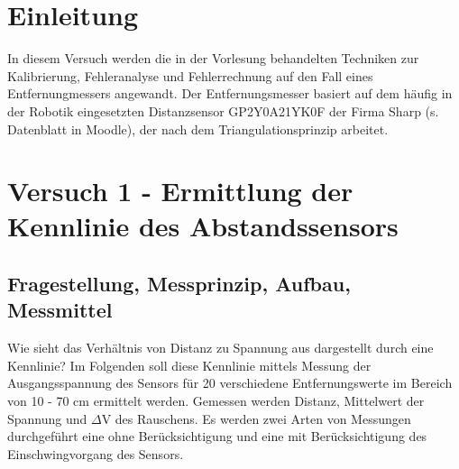 \documentclass[12pt,oneside,a4paper]{report}
\begin{document}




\clearpage

%
%


%
%


%
%


%
%




\setcounter{page}{1}
%
%
\chapter{Einleitung}
\label{chap:EINL}
\cite{Franz2015j}

In diesem Versuch werden die in der Vorlesung behandelten Techniken zur Kalibrierung, Fehleranalyse und Fehlerrechnung auf den Fall eines Entfernungmessers angewandt. Der Entfernungsmesser basiert auf dem häufig in der Robotik eingesetzten Distanzsensor GP2Y0A21YK0F der Firma Sharp (s. Datenblatt in Moodle), der nach dem Triangulationsprinzip arbeitet.


%
%
\chapter{Versuch 1 - Ermittlung der Kennlinie des Abstandssensors}
\label{chap:VERSUCH_1}

\section{Fragestellung, Messprinzip, Aufbau, Messmittel}
\label{chap:VERSUCH_1_FRAGESTELLUNG}

Wie sieht das Verhältnis von Distanz zu Spannung aus dargestellt durch eine Kennlinie? Im Folgenden soll diese Kennlinie mittels
  Messung der Ausgangsspannung des Sensors für 20 verschiedene   Entfernungswerte im Bereich von 10 - 70 cm ermittelt werden. Gemessen werden Distanz, Mittelwert der Spannung und $\Delta$V des Rauschens. Es werden zwei Arten von Messungen durchgeführt eine ohne Berücksichtigung und eine mit Berücksichtigung des Einschwingvorgang des Sensors. 
\end{document}
